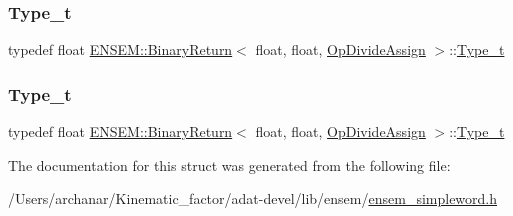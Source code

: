 \mbox{\label{structENSEM_1_1BinaryReturn_3_01float_00_01float_00_01OpDivideAssign_01_4_a9343566dc5cdc2470343502c7d2affe5}} 
\subsubsection{\texorpdfstring{Type\_t}{Type\_t}\hspace{0.1cm}{\footnotesize\ttfamily [2/3]}}
{\footnotesize\ttfamily typedef float \mbox{\hyperlink{structENSEM_1_1BinaryReturn}{E\+N\+S\+E\+M\+::\+Binary\+Return}}$<$ float, float, \mbox{\hyperlink{structENSEM_1_1OpDivideAssign}{Op\+Divide\+Assign}} $>$\+::\mbox{\hyperlink{structENSEM_1_1BinaryReturn_3_01float_00_01float_00_01OpDivideAssign_01_4_a9343566dc5cdc2470343502c7d2affe5}{Type\+\_\+t}}}

\mbox{\label{structENSEM_1_1BinaryReturn_3_01float_00_01float_00_01OpDivideAssign_01_4_a9343566dc5cdc2470343502c7d2affe5}} 
\subsubsection{\texorpdfstring{Type\_t}{Type\_t}\hspace{0.1cm}{\footnotesize\ttfamily [3/3]}}
{\footnotesize\ttfamily typedef float \mbox{\hyperlink{structENSEM_1_1BinaryReturn}{E\+N\+S\+E\+M\+::\+Binary\+Return}}$<$ float, float, \mbox{\hyperlink{structENSEM_1_1OpDivideAssign}{Op\+Divide\+Assign}} $>$\+::\mbox{\hyperlink{structENSEM_1_1BinaryReturn_3_01float_00_01float_00_01OpDivideAssign_01_4_a9343566dc5cdc2470343502c7d2affe5}{Type\+\_\+t}}}



The documentation for this struct was generated from the following file\+:\begin{DoxyCompactItemize}
\item 
/\+Users/archanar/\+Kinematic\+\_\+factor/adat-\/devel/lib/ensem/\mbox{\hyperlink{adat-devel_2lib_2ensem_2ensem__simpleword_8h}{ensem\+\_\+simpleword.\+h}}\end{DoxyCompactItemize}
